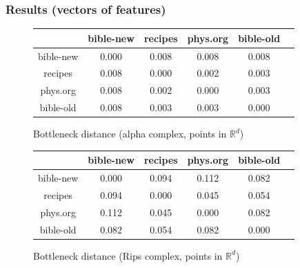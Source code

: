 \documentclass[unknownkeysallowed]{beamer}
\def\R{\mathbb R}
\begin{document}
\begin{frame}
\frametitle{Results (vectors of features)}
\bigskip
\begin{figure}
\begin{tabular}{ c c c c c c }
	& bible-new & recipes & phys.org & bible-old \\
  	\hline			
   bible-new & 0.000 & 0.008 & 0.008 & 0.008 \\
   recipes   & 0.008 & 0.000 & 0.002 & 0.003 \\
   phys.org  & 0.008 & 0.002 & 0.000 & 0.003 \\
   bible-old & 0.008 & 0.003 & 0.003 & 0.000 
\end{tabular}
\caption{Bottleneck distance (alpha complex, points in $\R ^d$)}
\end{figure}

\begin{figure}
\begin{tabular}{ c c c c c c }
	& bible-new & recipes & phys.org & bible-old \\
  	\hline			
  bible-new & 0.000 & 0.094 & 0.112  &  0.082 \\
  recipes   & 0.094 & 0.000 & 0.045  &  0.054 \\
  phys.org  & 0.112 & 0.045 & 0.000  &  0.082 \\
  bible-old & 0.082 & 0.054 & 0.082  &  0.000 
\end{tabular}
\caption{Bottleneck distance (Rips complex, points in $\R ^d$)}
\end{figure}
\medskip
\end{frame}
\end{document}

